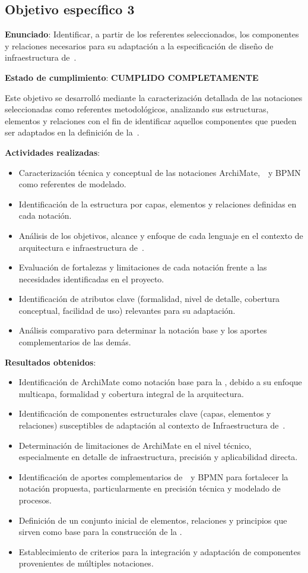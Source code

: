 \subsection{Objetivo específico 3}
\noindent

\textbf{Enunciado}: Identificar, a partir de los referentes seleccionados, los componentes y relaciones necesarios para su adaptación a la especificación de diseño de infraestructura de~\TI{}.

\textbf{Estado de cumplimiento}: \textbf{CUMPLIDO COMPLETAMENTE}

Este objetivo se desarrolló mediante la caracterización detallada de las notaciones seleccionadas como referentes metodológicos, analizando sus estructuras, elementos y relaciones con el fin de identificar aquellos componentes que pueden ser adaptados en la definición de la~\NDITI.

\textbf{Actividades realizadas}:
\begin{itemize}
    \item Caracterización técnica y conceptual de las notaciones ArchiMate,~\UML~y BPMN como referentes de modelado.
    \item Identificación de la estructura por capas, elementos y relaciones definidas en cada notación.
    \item Análisis de los objetivos, alcance y enfoque de cada lenguaje en el contexto de arquitectura e infraestructura de~\TI{}.
    \item Evaluación de fortalezas y limitaciones de cada notación frente a las necesidades identificadas en el proyecto.
    \item Identificación de atributos clave (formalidad, nivel de detalle, cobertura conceptual, facilidad de uso) relevantes para su adaptación.
    \item Análisis comparativo para determinar la notación base y los aportes complementarios de las demás.
\end{itemize}

\textbf{Resultados obtenidos}:
\begin{itemize}
    \item Identificación de ArchiMate como notación base para la \NDITI, debido a su enfoque multicapa, formalidad y cobertura integral de la arquitectura.
    \item Identificación de componentes estructurales clave (capas, elementos y relaciones) susceptibles de adaptación al contexto de Infraestructura de~\TI.
    \item Determinación de limitaciones de ArchiMate en el nivel técnico, especialmente en detalle de infraestructura, precisión y aplicabilidad directa.
    \item Identificación de aportes complementarios de~\UML~y BPMN para fortalecer la notación propuesta, particularmente en precisión técnica y modelado de procesos.
    \item Definición de un conjunto inicial de elementos, relaciones y principios que sirven como base para la construcción de la \NDITI.
    \item Establecimiento de criterios para la integración y adaptación de componentes provenientes de múltiples notaciones.
\end{itemize}

